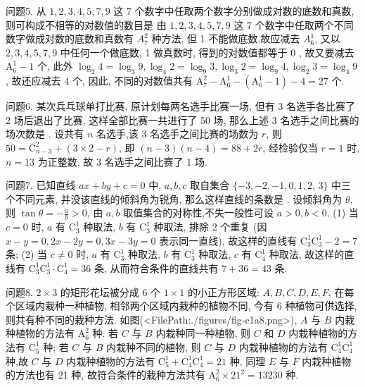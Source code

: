 问题5. 从 $1,2,3,4,5,7,9$ 这 7 个数字中任取两个数字分别做成对数的底数和真数, 则可构成不相等的对数值的数目是
由 $1,2,3,4,5,7,9$ 这 7 个数字中任取两个不同数字做成对数的底数和真数有 $A_7^2$ 种方法, 但 1 不能做底数,故应减去 $A_6^1$, 又以 $2,3,4,5,7,9$ 中任何一个做底数, 1 做真数时, 得到的对数值都等于 0 , 故又要减去 $\mathrm{A}_6^1-1$ 个, 此外 $\log _2 4=\log _3 9, \log _4 2=\log _9 3, \log _3 2=\log _9 4, \log _2 3=\log _4 9$, 故还应减去 4 个, 因此, 不同的对数值共有 $\mathrm{A}_7^2-\mathrm{A}_6^1-\left(\mathrm{A}_6^1-1\right)-4=27$ 个.



问题6. 某次兵乓球单打比赛, 原计划每两名选手比赛一场, 但有 3 名选手各比赛了 2 场后退出了比赛, 这样全部比赛一共进行了 50 场, 那么上述 3 名选手之间比赛的场次数是 . 
设共有 $n$ 名选手,该 3 名选手之间比赛的场数为 $r$, 则 $50=\mathrm{C}_{n-3}^2+(3 \times 2-r)$, 即 $(n-3)(n-4)=88+2 r$, 经检验仅当 $r=1$ 时, $n=13$ 为正整数, 故 3 名选手之间比赛了 1 场.



问题7. 已知直线 $a x+b y+c=0$ 中, $a, b, c$ 取自集合 $\{-3,-2,-1,0,1,2$, $3\}$ 中三个不同元素, 并没该直线的倾斜角为锐角, 那么这样直线的条数是 . 
设倾斜角为 $\theta$, 则 $\tan \theta=-\frac{a}{b}>0$, 由 $a, b$ 取值集合的对称性,不失一般性可设 $a>0, b<0$. (1) 当 $c=0$ 时, $a$ 有 $\mathrm{C}_3^1$ 种取法, $b$ 有 $\mathrm{C}_3^1$ 种取法, 排除 2 个重复 (因 $x-y=0,2 x-2 y=0,3 x-3 y=0$ 表示同一直线), 故这样的直线有 $\mathrm{C}_3^1 \mathrm{C}_3^1-2=7$ 条; (2) 当 $c \neq 0$ 时, $a$ 有 $\mathrm{C}_3^1$ 种取法, $b$ 有 $\mathrm{C}_3^1$ 种取法, $c$ 有 $\mathrm{C}_4^1$ 种取法, 故这样的直线有 $\mathrm{C}_3^1 \mathrm{C}_3^1 \cdot \mathrm{C}_4^1=36$ 条, 从而符合条件的直线共有 $7+36=43$ 条.



问题8. $2 \times 3$ 的矩形花坛被分成 6 个 $1 \times 1$ 的小正方形区域: $A, B, C, D, E, F$, 在每个区域内栽种一种植物, 相邻两个区域内栽种的植物不同, 今有 6 种植物可供选择,则共有种不同的栽种方法.
如图(<FilePath:./figures/fig-c1a8.png>), $A$ 与 $B$ 内栽种植物的方法有 $\mathrm{A}_6^2$ 种.
若 $C$ 与 $B$ 内栽种同一种植物, 则 $C$ 和 $D$ 内栽种植物的方法有 $\mathrm{C}_5^1$ 种; 若 $C$ 与 $B$ 内栽种不同的植物, 则 $C$ 与 $D$ 内栽种植物的方法有 $\mathrm{C}_4^1 \mathrm{C}_4^1$ 种,故 $C$ 与 $D$ 内栽种植物的方法有 $\mathrm{C}_5^1+\mathrm{C}_4^1 \mathrm{C}_4^1=21$ 种, 同理 $E$ 与 $F$ 内栽种植物的方法也有 21 种, 故符合条件的栽种方法共有 $\mathrm{A}_6^2 \times 21^2=13230$ 种.



